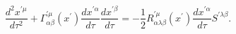 \begin{equation}
\frac{d^{2}x^{\prime\mu}}{d\tau^{2}}+\Gamma_{\alpha\beta}^{\prime\mu
}(x^{\prime})\frac{dx^{\prime\alpha}}{d\tau}\frac{dx^{\prime\beta}}{d\tau }=-%
\frac{1}{2}R_{\alpha\lambda\beta}^{\prime\mu}(x^{\prime})\frac
{dx^{\prime\alpha}}{d\tau}S^{\prime\lambda\beta}.  \label{16}
\end{equation}

